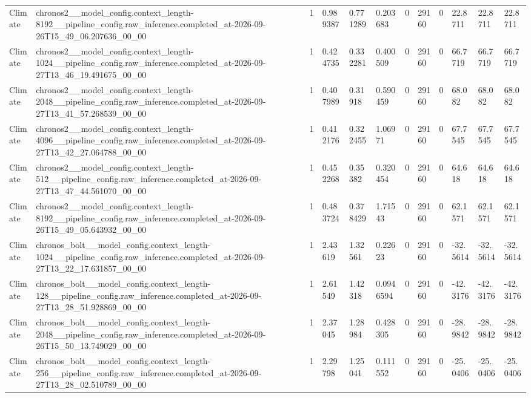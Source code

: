 \begin{tabular}{llllllllllll}
Climate & chronos2\_\_model\_config.context\_length-8192\_\_pipeline\_config.raw\_inference.completed\_at-2026-09-26T15\_49\_06.207636\_00\_00 & 1 & 0.989387 & 0.771289 & 0.203683 & 0 & 29160 & 0 & 22.8711 & 22.8711 & 22.8711 \\
Climate & chronos2\_\_model\_config.context\_length-1024\_\_pipeline\_config.raw\_inference.completed\_at-2026-09-27T13\_46\_19.491675\_00\_00 & 1 & 0.424735 & 0.332281 & 0.400509 & 0 & 29160 & 0 & 66.7719 & 66.7719 & 66.7719 \\
Climate & chronos2\_\_model\_config.context\_length-2048\_\_pipeline\_config.raw\_inference.completed\_at-2026-09-27T13\_41\_57.268539\_00\_00 & 1 & 0.407989 & 0.31918 & 0.590459 & 0 & 29160 & 0 & 68.082 & 68.082 & 68.082 \\
Climate & chronos2\_\_model\_config.context\_length-4096\_\_pipeline\_config.raw\_inference.completed\_at-2026-09-27T13\_42\_27.064788\_00\_00 & 1 & 0.412176 & 0.322455 & 1.06971 & 0 & 29160 & 0 & 67.7545 & 67.7545 & 67.7545 \\
Climate & chronos2\_\_model\_config.context\_length-512\_\_pipeline\_config.raw\_inference.completed\_at-2026-09-27T13\_47\_44.561070\_00\_00 & 1 & 0.452268 & 0.35382 & 0.320454 & 0 & 29160 & 0 & 64.618 & 64.618 & 64.618 \\
Climate & chronos2\_\_model\_config.context\_length-8192\_\_pipeline\_config.raw\_inference.completed\_at-2026-09-26T15\_49\_05.643932\_00\_00 & 1 & 0.483724 & 0.378429 & 1.71543 & 0 & 29160 & 0 & 62.1571 & 62.1571 & 62.1571 \\
Climate & chronos\_bolt\_\_model\_config.context\_length-1024\_\_pipeline\_config.raw\_inference.completed\_at-2026-09-27T13\_22\_17.631857\_00\_00 & 1 & 2.43619 & 1.32561 & 0.22623 & 0 & 29160 & 0 & -32.5614 & -32.5614 & -32.5614 \\
Climate & chronos\_bolt\_\_model\_config.context\_length-128\_\_pipeline\_config.raw\_inference.completed\_at-2026-09-27T13\_28\_51.928869\_00\_00 & 1 & 2.61549 & 1.42318 & 0.0946594 & 0 & 29160 & 0 & -42.3176 & -42.3176 & -42.3176 \\
Climate & chronos\_bolt\_\_model\_config.context\_length-2048\_\_pipeline\_config.raw\_inference.completed\_at-2026-09-26T15\_50\_13.749029\_00\_00 & 1 & 2.37045 & 1.28984 & 0.428305 & 0 & 29160 & 0 & -28.9842 & -28.9842 & -28.9842 \\
Climate & chronos\_bolt\_\_model\_config.context\_length-256\_\_pipeline\_config.raw\_inference.completed\_at-2026-09-27T13\_28\_02.510789\_00\_00 & 1 & 2.29798 & 1.25041 & 0.111552 & 0 & 29160 & 0 & -25.0406 & -25.0406 & -25.0406 \\

\end{tabular}
